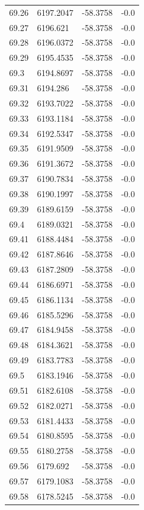 \begin{table}[H]
\begin{tabular}{llll}
69.26 & 6197.2047 & -58.3758 & -0.0 \\
69.27 & 6196.621 & -58.3758 & -0.0 \\
69.28 & 6196.0372 & -58.3758 & -0.0 \\
69.29 & 6195.4535 & -58.3758 & -0.0 \\
69.3 & 6194.8697 & -58.3758 & -0.0 \\
69.31 & 6194.286 & -58.3758 & -0.0 \\
69.32 & 6193.7022 & -58.3758 & -0.0 \\
69.33 & 6193.1184 & -58.3758 & -0.0 \\
69.34 & 6192.5347 & -58.3758 & -0.0 \\
69.35 & 6191.9509 & -58.3758 & -0.0 \\
69.36 & 6191.3672 & -58.3758 & -0.0 \\
69.37 & 6190.7834 & -58.3758 & -0.0 \\
69.38 & 6190.1997 & -58.3758 & -0.0 \\
69.39 & 6189.6159 & -58.3758 & -0.0 \\
69.4 & 6189.0321 & -58.3758 & -0.0 \\
69.41 & 6188.4484 & -58.3758 & -0.0 \\
69.42 & 6187.8646 & -58.3758 & -0.0 \\
69.43 & 6187.2809 & -58.3758 & -0.0 \\
69.44 & 6186.6971 & -58.3758 & -0.0 \\
69.45 & 6186.1134 & -58.3758 & -0.0 \\
69.46 & 6185.5296 & -58.3758 & -0.0 \\
69.47 & 6184.9458 & -58.3758 & -0.0 \\
69.48 & 6184.3621 & -58.3758 & -0.0 \\
69.49 & 6183.7783 & -58.3758 & -0.0 \\
69.5 & 6183.1946 & -58.3758 & -0.0 \\
69.51 & 6182.6108 & -58.3758 & -0.0 \\
69.52 & 6182.0271 & -58.3758 & -0.0 \\
69.53 & 6181.4433 & -58.3758 & -0.0 \\
69.54 & 6180.8595 & -58.3758 & -0.0 \\
69.55 & 6180.2758 & -58.3758 & -0.0 \\
69.56 & 6179.692 & -58.3758 & -0.0 \\
69.57 & 6179.1083 & -58.3758 & -0.0 \\
69.58 & 6178.5245 & -58.3758 & -0.0 \\

\end{tabular}
\end{table}
